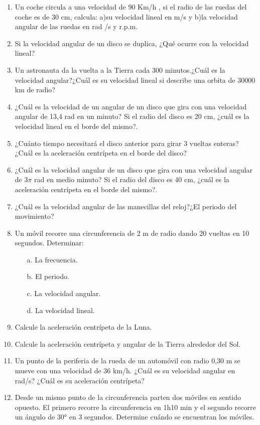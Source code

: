 \documentclass[a5paper,pagesize,10pt,bibtotoc,pointlessnumbers,
normalheadings,DIV=9,fleqn,x11names,table,twoside=false]{scrbook}
\begin{document}
\begin{enumerate}
\item Un coche circula a una velocidad de 90 Km/h , si el radio de las ruedas del coche es de 30
 cm, calcula: a)su velocidad 
lineal en m/s y b)la velocidad angular de las ruedas en rad /s y r.p.m.

\item  Si la velocidad angular de un disco se
 duplica, ¿Qué ocurre con la velocidad lineal?
 
\item Un astronauta da la vuelta a la Tierra cada 300 minutos.¿Cuál es la velocidad angular?¿Cuál es su velocidad lineal si 
describe una orbita de 30000 km de radio?

\item ¿Cuál es la velocidad de un angular de un disco que gira con una velocidad angular de 13,4 rad en un minuto? Si el radio 
del disco es 20 cm, ¿cuál es la velocidad lineal en el borde del mismo?.

\item ¿Cuánto tiempo necesitará el disco anterior para girar 3 vueltas enteras?¿Cuál es la aceleración centrípeta en el borde del 
disco?

\item ¿Cuál es la velocidad angular de un disco que gira con una velocidad angular de $3\pi$ rad en medio minuto? Si el radio del 
disco es 40 cm, ¿cuál es la aceleración centrípeta en el borde del mismo?.

\item ¿Cuál es la velocidad angular de las manecillas del reloj?¿El periodo del movimiento?

\item Un móvil recorre una circunferencia de 2 m de radio dando 20 vueltas en 10 segundos. Determinar:

\begin{itemize}
 \item [a.] La frecuencia.
 \item [b.] El periodo.
 \item [c.] La velocidad angular.
 \item [d.] La velocidad lineal.
\end{itemize}

\item Calcule la aceleración centrípeta de la   Luna.

\item Calcule la aceleración centrípeta y angular de la Tierra alrededor del Sol.

\item  Un punto de la periferia de la rueda de un automóvil con
 radio 0,30 m se mueve con una velocidad de 36 km/h. ¿Cuál es su 
velocidad angular en rad/s?
 ¿Cuál es su aceleración centrípeta?

\item Desde un mismo punto de la circunferencia parten dos
 móviles en sentido opuesto. El primero recorre la circunferencia en 
1h10 min y el segundo
 recorre un ángulo de 30° en 3 segundos. Determine cuándo se encuentran los móviles.


\end{enumerate}
\end{document}

